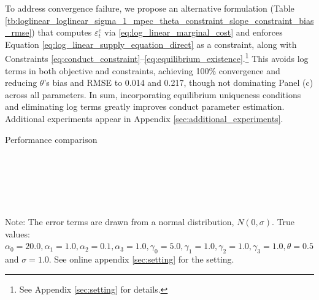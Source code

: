 \documentclass[11pt, a4paper]{article}
\theoremstyle{remark}
\begin{document}
To address convergence failure, we propose an alternative formulation (Table \ref{tb:loglinear_loglinear_sigma_1_mpec_theta_constraint_slope_constraint_bias_rmse}) that computes $\varepsilon^c_t$ via \eqref{eq:log_linear_marginal_cost} and enforces Equation \eqref{eq:log_linear_supply_equation_direct} as a constraint, along with Constraints \eqref{eq:conduct_constraint}–\eqref{eq:equilibrium_existence}.\footnote{See Appendix \ref{sec:setting} for details.}
This avoids log terms in both objective and constraints, achieving 100\% convergence and reducing $\theta$'s bias and RMSE to 0.014 and 0.217, though not dominating Panel (c) across all parameters.
In sum, incorporating equilibrium uniqueness conditions and eliminating log terms greatly improves conduct parameter estimation. Additional experiments appear in Appendix \ref{sec:additional_experiments}.


\begin{table}[!htbp]
  \begin{center}
  \caption{Performance comparison}
    \label{tb:loglinear_loglinear_sigma_1_simultaneous_non_constraint_theta_constraint_bias_rmse} 
  \\[0.5em]
  \begin{adjustbox}{width=\textwidth}
    
  \end{adjustbox}

  \vspace{1em}

  \\[0.5em]
  \begin{adjustbox}{width=\textwidth}
    
  \end{adjustbox}

  \vspace{1em}

  \\[0.5em]
  \begin{adjustbox}{width=\textwidth}
    
  \end{adjustbox}
  \end{center}
  \footnotesize
  Note: The error terms are drawn from a normal distribution, $N(0, \sigma)$. True values: $\alpha_0=20.0, \alpha_1=1.0, \alpha_2=0.1, \alpha_3=1.0, \gamma_0=5.0, \gamma_1=1.0, \gamma_2=1.0, \gamma_3=1.0, \theta=0.5$ and $\sigma=1.0$. See online appendix \ref{sec:setting} for the setting.
\end{table}
\end{document}
